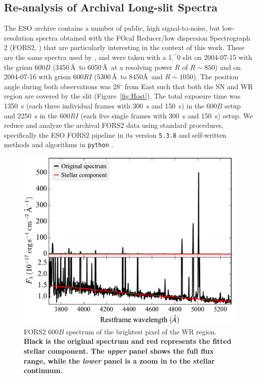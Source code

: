 \documentclass[traditabstract]{aa}
\newcommand{\farc}{\hbox{$.\!\!^{\prime\prime}$}}
\begin{document}
\begin{appendix}

\section{Re-analysis of Archival Long-slit Spectra}
\label{app:fors}

The ESO archive contains a number of public, high signal-to-noise, but low-resolution spectra obtained with the FOcal Reducer/low dispersion Spectrograph 2 (FORS2, \citealt{1998Msngr..94....1A}) that are particularly interesting in the context of this work. These are the same spectra used by \citet{2006A&A...454..103H}, and were taken with a 1\farc{0} slit on 2004-07-15 with the grism 600$B$ (3450\,\AA\, to 6050\,\AA\, at a resolving power $R$ of $R\sim850$) and on 2004-07-16 with grism 600$RI$ (5300\,\AA\, to 8450\AA\, and $R\sim1050$). The position angle during both observations was 28$^\circ$ from East such that both the SN and WR region are covered by the slit (Figure~\ref{fig:Host}). The total exposure time was 1350~s (each three individual frames with 300~s and 150~s) in the 600$B$ setup and 2250~s in the 600$RI$ (each five single frames with 300~s and 150~s) setup. We reduce and analyze the archival FORS2 data using standard procedures, specifically the ESO FORS2 pipeline in its version \texttt{5.3.8} and self-written methods and algorithms in \texttt{python} \citep{2015A&A...581A.125K}.

\begin{figure}
\includegraphics[angle=0, width=0.93\columnwidth]{Figs/FORS2_3700_5300_starlight.pdf}
\caption{FORS2 600$B$ spectrum of the brightest pixel of the WR region. \textbf{Black is the original spectrum and red represents the fitted stellar component. The \textit{upper} panel shows the full flux range, while the \textit{lower} panel is a zoom in to the stellar continuum.}}
\label{fig:FORSWR}
\end{figure}


\end{appendix}
\end{document}

